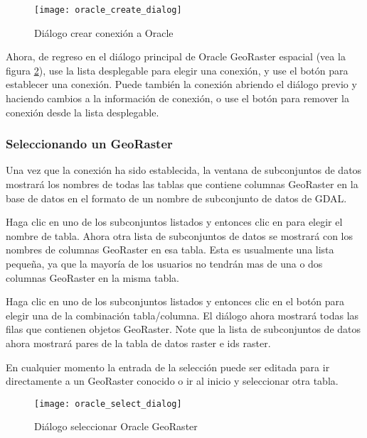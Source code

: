 \begin{figure}[ht]
   \begin{center}
   \caption{Diálogo crear conexión a Oracle \nixcaption}\label{fig:oracle_create}\smallskip
   \texttt{[image: oracle\_create\_dialog]}
\end{center}
\end{figure}

Ahora, de regreso en el diálogo principal de Oracle GeoRaster espacial (vea la figura \ref{fig:oracle_select}), use la lista desplegable para elegir una conexión, y use el  
botón  para establecer una conexión. Puede también 
 la conexión abriendo el diálogo previo y haciendo cambios a la información de conexión, o use el botón  para remover la conexión desde la lista desplegable.

\subsubsection{Seleccionando un GeoRaster}

Una vez que la conexión ha sido establecida, la ventana de subconjuntos de datos mostrará los nombres de todas las tablas que contiene columnas GeoRaster en la base de datos en el formato de un nombre de subconjunto de datos de GDAL.

Haga clic en uno de los subconjuntos listados y entonces clic en  para elegir el nombre de tabla. Ahora otra lista de subconjuntos de datos se mostrará con los nombres de columnas GeoRaster en esa tabla. Esta es usualmente una lista pequeña, ya que la mayoría de los usuarios no tendrán mas de una o dos columnas GeoRaster en la misma tabla.

Haga clic en uno de los subconjuntos listados y entonces clic en el botón  para elegir una de la combinación tabla/columna. El diálogo ahora mostrará todas las filas que contienen objetos GeoRaster. Note que la lista de subconjuntos de datos ahora mostrará pares de la tabla de datos raster   e ids raster.

En cualquier momento la entrada de la selección puede ser editada para ir directamente a un GeoRaster conocido o ir al inicio y seleccionar otra tabla.

\begin{figure}[ht]
   \begin{center}
   \caption{Diálogo seleccionar Oracle GeoRaster \nixcaption}\label{fig:oracle_select}\smallskip
   \texttt{[image: oracle\_select\_dialog]}
\end{center}
\end{figure}

